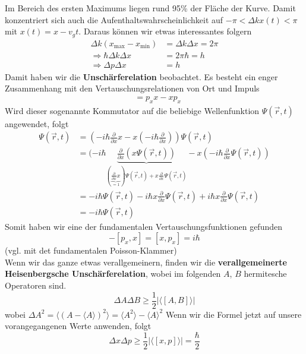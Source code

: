 \documentclass[oneside]{book}
\theoremstyle{definition}
\newcommand{\fpartial}[1]{\frac{\partial}{\partial #1}}
\begin{document}
Im Bereich des ersten Maximums liegen rund 95\% der Fläche der Kurve. Damit konzentriert sich auch die  Aufenthaltswahrscheinlichkeit auf $-\pi < \Delta k x(t) < \pi$ mit $x(t) = x - v_g t$. Daraus können wir etwas interessantes folgern
\begin{align*}
\Delta k (x_\text{max} - x_\text{min}) &= \Delta k \Delta x = 2 \pi\\
\Rightarrow \hbar\Delta k \Delta x &= 2 \pi \hbar = h\\
\Rightarrow \Delta p \Delta x &= h
\end{align*}
Damit haben wir die \textbf{Unschärferelation} beobachtet. Es besteht ein enger Zusammenhang mit den Vertauschungsrelationen von Ort und Impuls
\begin{align*}
	[p_x, x] &= p_x x - x p_x
\end{align*}
Wird dieser sogenannte Kommutator auf die beliebige Wellenfunktion $\Psi(\vec{r}, t)$ angewendet, folgt
\begin{align*}
[p_x, x] \Psi(\vec{r}, t) &= (- i \hbar \fpartial{x} x - x (- i \hbar \fpartial{x})) \Psi(\vec{r}, t)\\
&= (-i\hbar\underbrace{\fpartial{x} (x \Psi(\vec{r}, t))}_{(\underbrace{\fpartial{x} x}_{=1}) \Psi(\vec{r}, t) + x \fpartial{x} \Psi(\vec{r}, t)} - x (- i \hbar \fpartial{x} \Psi(\vec{r}, t))\\
&= - i \hbar \Psi(\vec{r}, t) - i \hbar x \fpartial{x} \Psi(\vec{r}, t) + i \hbar x \fpartial{x} \Psi(\vec{r}, t)\\
&= - i \hbar \Psi(\vec{r}, t)
\end{align*}
Somit haben wir eine der fundamentalen Vertauschungsfunktionen gefunden
$$-[p_x, x] = [x, p_x] = i \hbar$$
(vgl. mit det fundamentalen Poisson-Klammer)\\
Wenn wir das ganze etwas verallgemeinern, finden wir die \textbf{verallgemeinerte Heisenbergsche Unschärferelation}, wobei im folgenden $A$, $B$ hermitesche Operatoren sind.
$$\Delta A \Delta B \geq \frac12 |\langle [A, B] \rangle|$$
wobei $\Delta A^2 = \langle (A - \langle A \rangle)^2 \rangle = \langle A^2 \rangle - \langle A \rangle^2$
Wenn wir die Formel jetzt auf unsere vorangegangenen Werte anwenden, folgt
$$\Delta x \Delta p \geq \frac12 | \langle [x, p] \rangle | = \frac{\hbar}{2}$$
\end{document}
